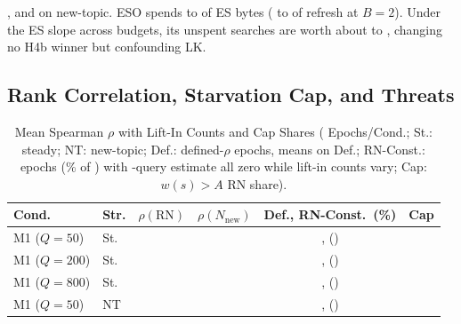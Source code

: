 \RNumLookaheadMThreeBFourNewTopic{}, and \RNumLookaheadMThreeBEightNewTopic{} on new-topic. ESO spends \RNumMThreeESOShareOfESMin{} to \RNumMThreeESOShareOfESMax{} of ES bytes (\RNumMThreeESOShareOfRefreshBTwoNewTopic{} to \RNumMThreeESOShareOfRefreshBTwoSteady{} of refresh at $B{=}2$). Under the ES slope across budgets, its unspent searches are worth about \RNumMThreeESOUnderspendValMin{} to \RNumMThreeESOUnderspendValMax{}, changing no H4b winner but confounding LK.

\subsection{Rank Correlation, Starvation Cap, and Threats}
\label{sec:results_diagnostics}

\begin{table}[!t]
\centering
\caption{Mean Spearman $\rho$ with Lift-In Counts and Cap Shares (\RNumEpochsPerCondition{} Epochs/Cond.; St.: steady; NT: new-topic; Def.: defined-$\rho$ epochs, means on Def.; RN-Const.: epochs (\% of \RNumEpochsPerCondition{}) with \RNumSampleQueries{}-query estimate all zero while lift-in counts vary; Cap: $w(s){>}A$ RN share).}
\label{tab:spearman}
\scriptsize
\renewcommand{\arraystretch}{0.68}
\setlength{\tabcolsep}{2.5pt}
\begin{tabular}{@{}llcccc@{}}
\toprule
\textbf{Cond.} & \textbf{Str.} & \textbf{$\rho(\text{RN})$} & \textbf{$\rho(N_{\text{new}})$} & \textbf{Def., RN-Const.\ (\%)} & \textbf{Cap} \\
\midrule
M1 ($Q{=}50$) & St. & \RNumSpearmanRNSteadyMOneQFifty{} & \RNumSpearmanNewVecsSteadyMOneQFifty{} & \RNumSpearmanPairedNSteadyMOneQFifty{}, \RNumSpearmanZeroEpochsSteadyMOneQFifty{} (\RNumSpearmanZeroPctSteadyMOneQFifty{}) & \RNumForcedShareRNSteadyMOneQFifty{} \\
M1 ($Q{=}200$) & St. & \RNumSpearmanRNSteadyMOne{} & \RNumSpearmanNewVecsSteadyMOne{} & \RNumSpearmanPairedNSteadyMOne{}, \RNumSpearmanZeroEpochsSteadyMOne{} (\RNumSpearmanZeroPctSteadyMOne{}) & \RNumForcedShareRNSteadyMOne{} \\
M1 ($Q{=}800$) & St. & \RNumSpearmanRNSteadyMOneQEightHundred{} & \RNumSpearmanNewVecsSteadyMOneQEightHundred{} & \RNumSpearmanPairedNSteadyMOneQEightHundred{}, \RNumSpearmanZeroEpochsSteadyMOneQEightHundred{} (\RNumSpearmanZeroPctSteadyMOneQEightHundred{}) & \RNumForcedShareRNSteadyMOneQEightHundred{} \\
M1 ($Q{=}50$) & NT & \RNumSpearmanRNNewTopicMOneQFifty{} & \RNumSpearmanNewVecsNewTopicMOneQFifty{} & \RNumSpearmanPairedNNewTopicMOneQFifty{}, \RNumSpearmanZeroEpochsNewTopicMOneQFifty{} (\RNumSpearmanZeroPctNewTopicMOneQFifty{}) & \RNumForcedShareRNNewTopicMOneQFifty{} \\

\end{tabular}
\end{table}
